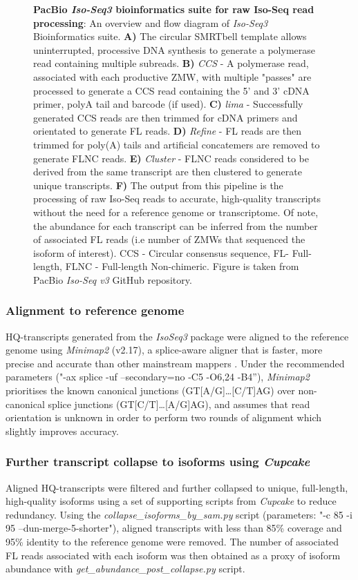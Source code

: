 \begin{figure}[htp]
	{\textbf{PacBio \textit{Iso-Seq3} bioinformatics suite for raw Iso-Seq read processing}: An overview and flow diagram of \textit{Iso-Seq3} Bioinformatics suite. \textbf{A)} The circular SMRTbell template allows uninterrupted, processive DNA synthesis to generate a polymerase read containing multiple subreads. \textbf{B)} \textit{CCS} - A polymerase read, associated with each productive ZMW, with multiple "passes" are processed to generate a CCS read containing the 5' and 3' cDNA primer, polyA tail and barcode (if used). \textbf{C)} \textit{lima} - Successfully generated CCS reads are then trimmed for cDNA primers and orientated to generate FL reads. \textbf{D)} \textit{Refine} - FL reads are then trimmed for poly(A) tails and artificial concatemers are removed to generate FLNC reads. \textbf{E)} \textit{Cluster} - FLNC reads considered to be derived from the same transcript are then clustered to generate unique transcripts. \textbf{F)} The output from this pipeline is the processing of raw Iso-Seq reads to accurate, high-quality transcripts without the need for a reference genome or transcriptome. Of note, the abundance for each transcript can be inferred from the number of associated FL reads (i.e number of ZMWs that sequenced the isoform of interest). CCS - Circular consensus sequence, FL- Full-length, FLNC - Full-length Non-chimeric. Figure is taken from PacBio \textit{Iso-Seq v3} GitHub repository\cite{githubp}.}
	\label{fig:isoseq3_tool}
\end{figure}

\newpage
\subsubsection{Alignment to reference genome} 
HQ-transcripts generated from the \textit{IsoSeq3} package were aligned to the reference genome using \textit{Minimap2}\cite{Li2018} (v2.17), a splice-aware aligner that is faster, more precise and accurate than other mainstream mappers \cite{SimirKriZanoviC2018,Tang2020}. Under the recommended parameters ("-ax splice -uf --secondary=no -C5 -O6,24 -B4”), \textit{Minimap2} prioritises the known canonical junctions (GT[A/G]…[C/T]AG) over non-canonical splice junctions (GT[C/T]…[A/G]AG), and assumes that read orientation is unknown in order to perform two rounds of alignment which slightly improves accuracy. 

\subsubsection{Further transcript collapse to isoforms using \textit{Cupcake}}
Aligned HQ-transcripts were filtered and further collapsed to unique, full-length, high-quality isoforms using a set of supporting scripts from \textit{Cupcake} to reduce redundancy. Using the \textit{collapse\_isoforms\_by\_sam.py} script (parameters: "-c 85 -i 95 --dun-merge-5-shorter"), aligned transcripts with less than 85\% coverage and 95\% identity to the reference genome were removed. The number of associated FL reads associated with each isoform was then obtained as a proxy of isoform abundance with \textit{get\_abundance\_post\_collapse.py} script. 

